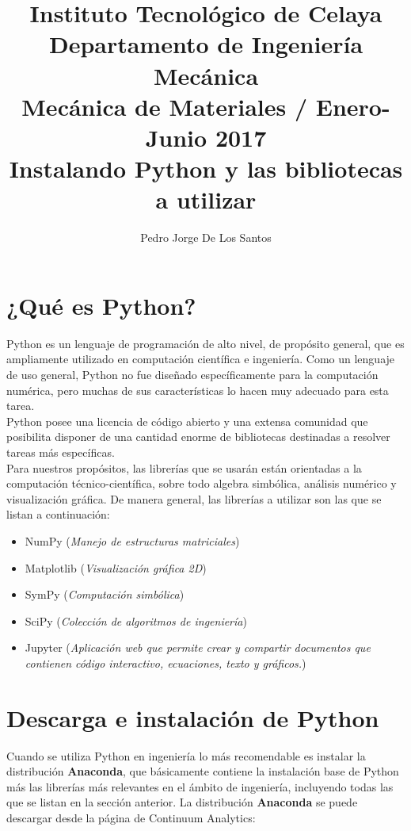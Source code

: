 \documentclass[12pt,letterpaper]{article}
\author{{\small Pedro Jorge De Los Santos}}
\title{
\vspace{-20mm}
{\normalsize Instituto Tecnológico de Celaya}\\[-2mm]
{\normalsize Departamento de Ingeniería Mecánica}\\[-2mm]
{\normalsize Mecánica de Materiales / Enero-Junio 2017} \\[-2mm]
{\normalsize\bfseries Instalando Python y las bibliotecas a utilizar}
}
\date{}
\begin{document}
\maketitle

\section{¿Qué es Python?}

Python es un lenguaje de programación de alto nivel, de propósito general, que es ampliamente utilizado en computación científica e ingeniería. Como un lenguaje de uso general, Python no fue diseñado específicamente para la computación numérica, pero muchas de sus características lo hacen muy adecuado para esta tarea. \\

Python posee una licencia de código abierto y una extensa comunidad que posibilita disponer de una cantidad enorme de bibliotecas destinadas 
a resolver tareas más específicas. \\

Para nuestros propósitos, las librerías que se usarán están orientadas a la computación técnico-científica, sobre todo algebra simbólica, análisis numérico y 
visualización gráfica. De manera general, las librerías a utilizar son las que se listan a continuación:

\begin{itemize}
\item NumPy (\textit{Manejo de estructuras matriciales})
\item Matplotlib (\textit{Visualización gráfica 2D})
\item SymPy (\textit{Computación simbólica})
\item SciPy (\textit{Colección de algoritmos de ingeniería})
\item Jupyter (\textit{Aplicación web que permite crear y compartir documentos que contienen código interactivo, ecuaciones, texto y gráficos.})
\end{itemize}


\section{Descarga e instalación de Python}

Cuando se utiliza Python en ingeniería lo más recomendable es instalar la distribución \textbf{Anaconda}, que básicamente contiene la instalación base 
de Python más las librerías más relevantes en el ámbito de ingeniería, incluyendo todas las que se listan en la sección anterior. La 
distribución \textbf{Anaconda} se puede descargar desde la página de Continuum Analytics: \\
\end{document}

